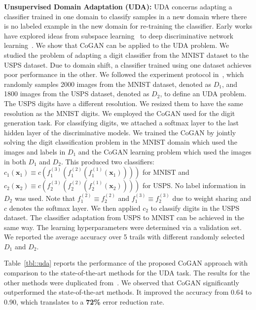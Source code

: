 \documentclass{article}
\begin{document}
{\bf Unsupervised Domain Adaptation (UDA):} UDA concerns adapting a classifier trained in one domain to classify samples in a new domain where there is no labeled example in the new domain for re-training the classifier. Early works have explored ideas from subspace learning~\cite{long2013transfer,fernando2015joint} to deep discriminative network learning~\cite{tzeng2014deep,rozantsev2016beyond,ganin2016domain}. We show that CoGAN can be applied to the UDA problem. We studied the problem of adapting a digit classifier from the MNIST dataset to the USPS dataset. Due to domain shift, a classifier trained using one dataset achieves poor performance in the other. We followed the experiment protocol in~\cite{long2013transfer,rozantsev2016beyond}, which randomly samples 2000 images from the MNIST dataset, denoted as $D_1$, and 1800 images from the USPS dataset, denoted as $D_2$, to define an UDA problem. The USPS digits have a different resolution. We resized them to have the same resolution as the MNIST digits. We employed the CoGAN used for the digit generation task. For classifying digits, we attached a softmax layer to the last hidden layer of the discriminative models. We trained the CoGAN by jointly solving the digit classification problem in the MNIST domain which used the images and labels in $D_1$ and the CoGAN learning problem which used the images in both $D_1$ and $D_2$. This produced two classifiers: $c_1(\mathbf{x}_1)\equiv c(f_1^{(3)}(f_1^{(2)}(f_1^{(1)}(\mathbf{x}_1))))$ for MNIST and $c_2(\mathbf{x}_2)\equiv c(f_2^{(3)}(f_2^{(2)}(f_2^{(1)}(\mathbf{x}_2))))$ for USPS. No label information in $D_2$ was used. Note that $f_1^{(2)}\equiv f_2^{(2)}$ and $f_1^{(3)}\equiv f_2^{(3)}$ due to weight sharing and $c$ denotes the softmax layer. We then applied $c_2$ to classify digits in the USPS dataset. The classifier adaptation from USPS to MNIST can be achieved in the same way. The learning hyperparameters were determined via a validation set. We reported the average accuracy over 5 trails with different randomly selected $D_1$ and $D_2$.

Table~\ref{tbl::uda} reports the performance of the proposed CoGAN approach with comparison to the state-of-the-art methods for the UDA task. The results for the other methods were duplicated from~\cite{rozantsev2016beyond}. We observed that CoGAN significantly outperformed the state-of-the-art methods. It improved the accuracy from 0.64 to 0.90, which translates to a {\bf 72\%} error reduction rate.
\end{document}
